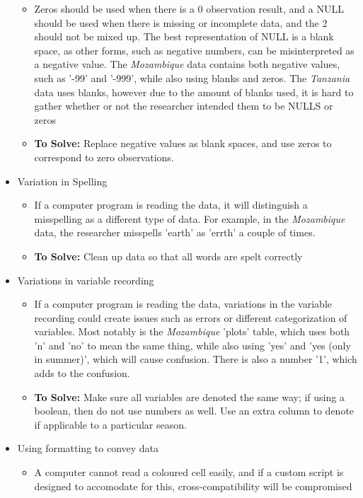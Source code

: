 \documentclass{article}
\begin{document}
\begin{itemize}
\begin{itemize}
        \item Zeros should be used when there is a 0 observation result, and a NULL should be used when there is missing or incomplete data, and the 2 should not be mixed up. The best representation of NULL is a blank space, as other forms, such as negative numbers, can be misinterpreted as a negative value. The \textit{Mozambique} data contains both negative values, such as '-99' and '-999', while also using blanks and zeros. The \textit{Tanzania} data uses blanks, however due to the amount of blanks used, it is hard to gather whether or not the researcher intended them to be NULLS or zeros
        \item \textbf{To Solve:} Replace negative values as blank spaces, and use zeros to correspond to zero observations. 
    \end{itemize}
    \item Variation in Spelling
    \begin{itemize}
        \item If a computer program is reading the data, it will distinguish a misspelling as a different type of data. For example, in the \textit{Mozambique} data, the researcher misspells 'earth' as 'errth' a couple of times.
        \item \textbf{To Solve:} Clean up data so that all words are spelt correctly
    \end{itemize}
    \item Variations in variable recording
    \begin{itemize}
        \item If a computer program is reading the data, variations in the variable recording could create issues such as errors or different categorization of variables. Most notably is the \textit{Mozambique} 'plots' table, which uses both 'n' and 'no' to mean the same thing, while also using 'yes' and 'yes (only in summer)', which will cause confusion. There is also a number '1', which adds to the confusion.
        \item \textbf{To Solve:} Make sure all variables are denoted the same way; if using a boolean, then do not use numbers as well. Use an extra column to denote if applicable to a particular season.
    \end{itemize}
    \item Using formatting to convey data
    \begin{itemize}
        \item A computer cannot read a coloured cell easily, and if a custom script is designed to accomodate for this, cross-compatibility will be compromised

\end{itemize}
\end{itemize}
\end{document}
